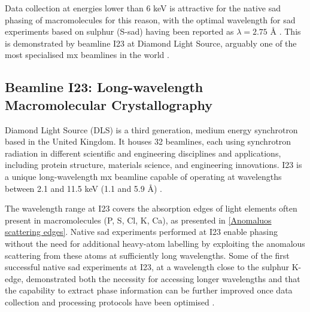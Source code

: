 Data collection at energies lower than 6 \unit{keV} is attractive for the native \ac{sad} phasing of macromolecules for this reason, with the optimal wavelength for \ac{sad} experiments based on sulphur (S-\ac{sad}) having been reported as $\lambda = 2.75$ Å \cite{Omari2023}. This is demonstrated %
by beamline I23 at Diamond Light Source, arguably one of the most specialised \ac{mx} beamlines in the world \cite{Foerster2019}. %

\subsection{Beamline I23: Long-wavelength Macromolecular Crystallography}

Diamond Light Source (DLS) is a third generation, medium energy synchrotron based in the United Kingdom. It houses 32 beamlines, each using synchrotron radiation in different scientific and engineering disciplines and applications, including protein structure, materials science, and engineering innovations.
I23 is a unique long-wavelength \ac{mx} beamline capable of operating at wavelengths between 2.1 and 11.5 \unit{keV} (1.1 and 5.9 Å) \cite{Wagner2016}.

The wavelength range at I23 covers the absorption edges of
light elements often present in macromolecules (P, S, Cl, K, Ca), as presented in \cref{Anomaluos scattering edges}.
Native \ac{sad} experiments performed at I23 enable phasing without the need for additional heavy-atom labelling by exploiting the anomalous scattering from these atoms at sufficiently long wavelengths. Some of the first successful native \ac{sad} experiments at I23, at a wavelength close to the sulphur K-edge, demonstrated both the necessity for accessing longer wavelengths and that the capability to extract phase information can be further improved once data collection and processing protocols have been optimised \cite{Aurelius2017}.

